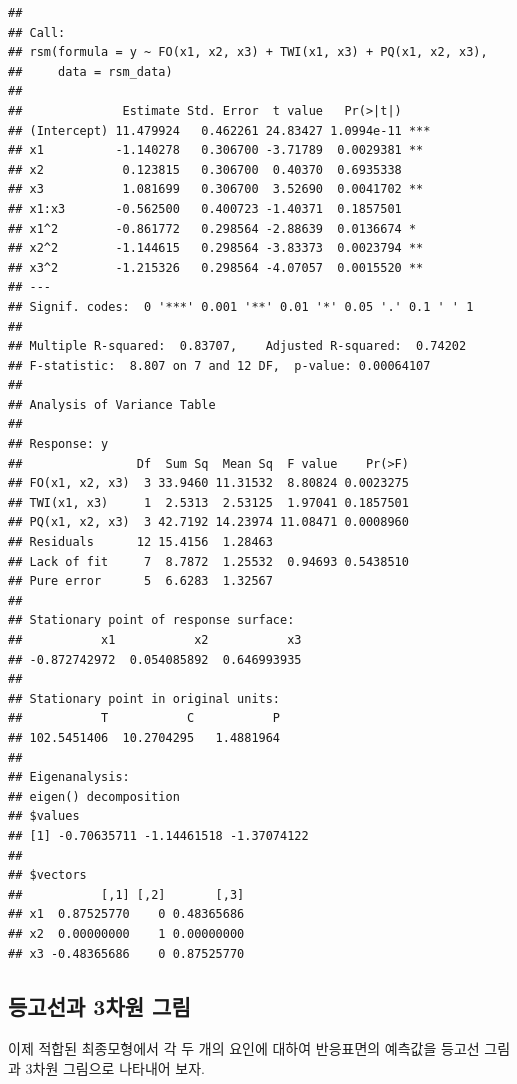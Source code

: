 \documentclass[
]{book}
\newenvironment{Shaded}{\begin{snugshade}}{\end{snugshade}}
\newcommand{\AttributeTok}[1]{\textcolor[rgb]{0.77,0.63,0.00}{#1}}
\newcommand{\ConstantTok}[1]{\textcolor[rgb]{0.00,0.00,0.00}{#1}}
\newcommand{\DecValTok}[1]{\textcolor[rgb]{0.00,0.00,0.81}{#1}}
\newcommand{\FunctionTok}[1]{\textcolor[rgb]{0.00,0.00,0.00}{#1}}
\newcommand{\NormalTok}[1]{#1}
\newcommand{\SpecialCharTok}[1]{\textcolor[rgb]{0.00,0.00,0.00}{#1}}
\theoremstyle{definition}
\theoremstyle{definition}
\theoremstyle{definition}
\theoremstyle{definition}
\theoremstyle{remark}
\begin{document}
\begin{verbatim}
## 
## Call:
## rsm(formula = y ~ FO(x1, x2, x3) + TWI(x1, x3) + PQ(x1, x2, x3), 
##     data = rsm_data)
## 
##              Estimate Std. Error  t value   Pr(>|t|)    
## (Intercept) 11.479924   0.462261 24.83427 1.0994e-11 ***
## x1          -1.140278   0.306700 -3.71789  0.0029381 ** 
## x2           0.123815   0.306700  0.40370  0.6935338    
## x3           1.081699   0.306700  3.52690  0.0041702 ** 
## x1:x3       -0.562500   0.400723 -1.40371  0.1857501    
## x1^2        -0.861772   0.298564 -2.88639  0.0136674 *  
## x2^2        -1.144615   0.298564 -3.83373  0.0023794 ** 
## x3^2        -1.215326   0.298564 -4.07057  0.0015520 ** 
## ---
## Signif. codes:  0 '***' 0.001 '**' 0.01 '*' 0.05 '.' 0.1 ' ' 1
## 
## Multiple R-squared:  0.83707,    Adjusted R-squared:  0.74202 
## F-statistic:  8.807 on 7 and 12 DF,  p-value: 0.00064107
## 
## Analysis of Variance Table
## 
## Response: y
##                Df  Sum Sq  Mean Sq  F value    Pr(>F)
## FO(x1, x2, x3)  3 33.9460 11.31532  8.80824 0.0023275
## TWI(x1, x3)     1  2.5313  2.53125  1.97041 0.1857501
## PQ(x1, x2, x3)  3 42.7192 14.23974 11.08471 0.0008960
## Residuals      12 15.4156  1.28463                   
## Lack of fit     7  8.7872  1.25532  0.94693 0.5438510
## Pure error      5  6.6283  1.32567                   
## 
## Stationary point of response surface:
##           x1           x2           x3 
## -0.872742972  0.054085892  0.646993935 
## 
## Stationary point in original units:
##           T           C           P 
## 102.5451406  10.2704295   1.4881964 
## 
## Eigenanalysis:
## eigen() decomposition
## $values
## [1] -0.70635711 -1.14461518 -1.37074122
## 
## $vectors
##           [,1] [,2]       [,3]
## x1  0.87525770    0 0.48365686
## x2  0.00000000    1 0.00000000
## x3 -0.48365686    0 0.87525770
\end{verbatim}

\hypertarget{uxb4f1uxace0uxc120uxacfc-3uxcc28uxc6d0-uxadf8uxb9bc-1}{%
\subsection{등고선과 3차원 그림}\label{uxb4f1uxace0uxc120uxacfc-3uxcc28uxc6d0-uxadf8uxb9bc-1}}

이제 적합된 최종모형에서 각 두 개의 요인에 대하여 반응표면의 예측값을 등고선 그림과 3차원 그림으로 나타내어 보자.

\begin{Shaded}
\end{Shaded}
\end{document}
